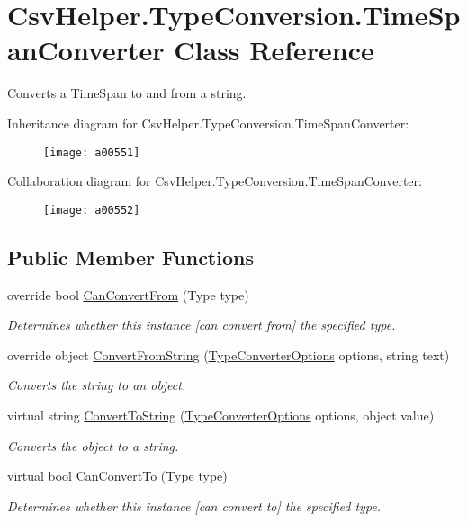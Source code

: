 \hypertarget{a00162}{\section{Csv\-Helper.\-Type\-Conversion.\-Time\-Span\-Converter Class Reference}
\label{a00162}
}


Converts a Time\-Span to and from a string.  




Inheritance diagram for Csv\-Helper.\-Type\-Conversion.\-Time\-Span\-Converter\-:
\nopagebreak
\begin{figure}[H]
\begin{center}
\leavevmode
\texttt{[image: a00551]}
\end{center}
\end{figure}


Collaboration diagram for Csv\-Helper.\-Type\-Conversion.\-Time\-Span\-Converter\-:
\nopagebreak
\begin{figure}[H]
\begin{center}
\leavevmode
\texttt{[image: a00552]}
\end{center}
\end{figure}
\subsection*{Public Member Functions}
\begin{DoxyCompactItemize}
\item 
override bool \hyperlink{a00162_ae3f8d46f5176d2ae08ac3fcdda1951e7}{Can\-Convert\-From} (Type type)
\begin{DoxyCompactList}\small\item\em Determines whether this instance \mbox{[}can convert from\mbox{]} the specified type. \end{DoxyCompactList}\item 
override object \hyperlink{a00162_a0f2536c88227a94822d0b7730eedf3eb}{Convert\-From\-String} (\hyperlink{a00168}{Type\-Converter\-Options} options, string text)
\begin{DoxyCompactList}\small\item\em Converts the string to an object. \end{DoxyCompactList}\item 
virtual string \hyperlink{a00078_a36cb2f9b24f15a671293f3a722324c27}{Convert\-To\-String} (\hyperlink{a00168}{Type\-Converter\-Options} options, object value)
\begin{DoxyCompactList}\small\item\em Converts the object to a string. \end{DoxyCompactList}\item 
virtual bool \hyperlink{a00078_acb65bd8c8199d88d5b1629ae35d18514}{Can\-Convert\-To} (Type type)
\begin{DoxyCompactList}\small\item\em Determines whether this instance \mbox{[}can convert to\mbox{]} the specified type. \end{DoxyCompactList}\end{DoxyCompactItemize}


